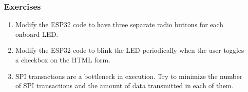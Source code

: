 \subsubsection{Exercises}
\begin{enumerate}
    \item Modify the ESP32 code to have three separate radio buttons for each
    onboard LED.
    \item Modify the ESP32 code to blink the LED periodically when the user
    toggles a checkbox on the HTML form.
    \item SPI transactions are a bottleneck in execution. Try to minimize the
    number of SPI transactions and the amount of data transmitted in each of
    them.
\end{enumerate}